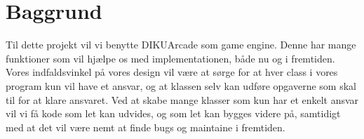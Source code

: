 \section{Baggrund}
Til dette projekt vil vi benytte DIKUArcade som game engine. Denne har mange funktioner som vil hjælpe os med implementationen, både nu og i fremtiden. Vores indfaldsvinkel på vores design vil være at sørge for at hver class i vores program kun vil have et ansvar, og at klassen selv kan udføre opgaverne som skal til for at klare ansvaret. Ved at skabe mange klasser som kun har et enkelt ansvar vil vi få kode som let kan udvides, og som let kan bygges videre på, samtidigt med at det vil være nemt at finde bugs og maintaine i fremtiden. 